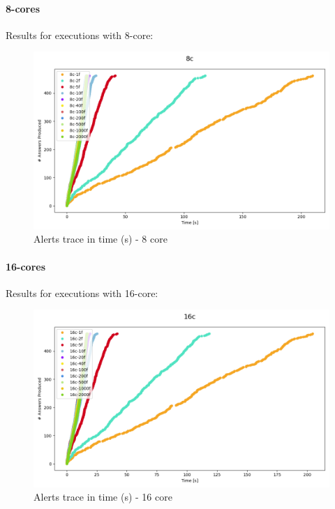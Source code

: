 \documentclass[12pt,a4paper]{article}
\begin{document}
\paragraph{8-cores\\}

Results for executions with 8-core:

\begin{figure}[H]
  \centering
  \includegraphics[scale = 0.5]{images/4-Experiments/E2/fixedcores/8c/traces.png}
  \caption{Alerts trace in time (s) - 8 core}
\end{figure}

\paragraph{16-cores\\}

Results for executions with 16-core:

\begin{figure}[H]
  \centering
  \includegraphics[scale = 0.5]{images/4-Experiments/E2/fixedcores/16c/traces.png}
  \caption{Alerts trace in time (s) - 16 core}
\end{figure}
\end{document}
